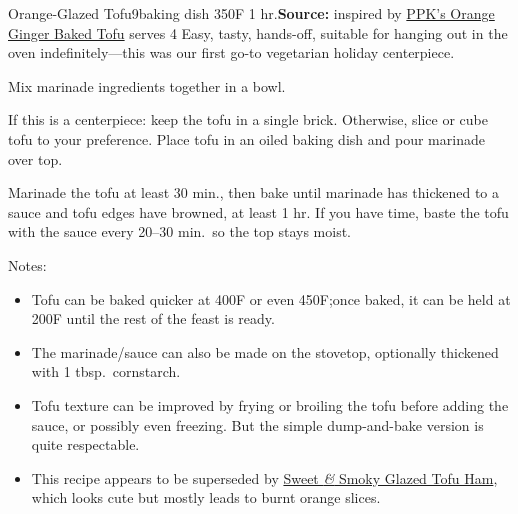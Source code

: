\begin{recipe}{Orange-Glazed Tofu}{9\inch{}\inch baking dish \hfill 350\0F \hfill 1 hr.}{\textbf{Source:} inspired by \href{https://web.archive.org/web/20101121022851/https://www.theppk.com/2010/04/orange-ginger-baked-tofu/}{PPK's Orange Ginger Baked Tofu} \hfill serves 4}
 \freeform Easy, tasty, hands-off, suitable for hanging out in the oven indefinitely---this was our first go-to vegetarian holiday centerpiece.

 Mix marinade ingredients together in a bowl.

 If this is a centerpiece: keep the tofu in a single brick. Otherwise, slice or cube tofu to your preference. Place tofu in an oiled baking dish and pour marinade over top.

 \newstep Marinade the tofu at least 30 min., then bake until marinade has thickened to a sauce and tofu edges have browned, at least 1 hr. If you have time, baste the tofu with the sauce every 20--30 min.\ so the top stays moist.

 \freeform Notes:
 \begin{itemize}
  \item Tofu can be baked quicker at 400\0F or even 450\0F;\@ once baked, it can be held at 200\0F until the rest of the feast is ready.
  \item The marinade/sauce can also be made on the stovetop, optionally thickened with 1 tbsp.\ cornstarch.
  \item Tofu texture can be improved by frying or broiling the tofu before adding the sauce, or possibly even freezing. But the simple dump-and-bake version is quite respectable.
  \item This recipe appears to be superseded by \href{https://www.theppk.com/2016/12/sweet-smoky-glazed-tofu-ham/}{Sweet \textit{\&} Smoky Glazed Tofu Ham}, which looks cute but mostly leads to burnt orange slices.
 \end{itemize}
\end{recipe}

